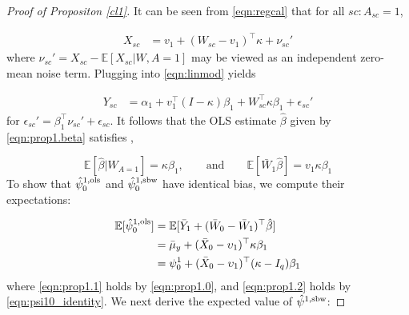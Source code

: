 \begin{proof}[Proof of Propositon \ref{cl1}]
It can be seen from \eqref{eqn:regcal} that for all $sc: A_{sc}=1$,

\begin{align*}
   X_{sc} &= v_1 + (W_{sc} - v_1)^\top \kappa + \nu_{sc}'
\end{align*}
where $\nu_{sc}' = X_{sc} - \mathbb{E}[X_{sc}|W,A=1]$ may be viewed as an independent zero-mean noise term. Plugging into \eqref{eqn:linmod} yields 

\begin{align*}
   Y_{sc} & = \alpha_1 + v_1^\top (I - \kappa)\beta_1 + W_{sc}^\top \kappa \beta_1 + \epsilon_{sc}'
\end{align*}
for $\epsilon_{sc}' = \beta_1^\top\nu_{sc}' + \epsilon_{sc}$. It follows that the OLS estimate $\hat{\beta}$ given by \eqref{eqn:prop1.beta} satisfies \citep{gleser1992importance},

\begin{equation}\label{eqn:prop1.0}
\mathbb{E}[\hat{\beta}|W_{A=1}] = \kappa \beta_1, \qquad \text{and} \qquad \mathbb{E}[\bar{W}_1 \hat{\beta}] = v_1 \kappa \beta_1
\end{equation}
To show that $\hat{\psi}_0^{1,\textup{ols}}$ and $\hat{\psi}_0^{1, \textup{sbw}}$ have identical bias, we compute their expectations:

\begin{align}
\nonumber	\mathbb{E}[\hat{\psi}_0^{1,\textup{ols}}] &= \mathbb{E}[ \bar{Y}_1 + (\bar{W}_0 - \bar{W}_1)^\top \hat{\beta}] \\
	& = \bar{\mu}_y + (\bar{X}_0 - \upsilon_1)^\top\kappa\beta_1 \label{eqn:prop1.1}\\
	& = \psi_0^1 + (\bar{X}_0 - \upsilon_1)^\top(\kappa - I_q)\beta_1 \label{eqn:prop1.2}
\end{align}
where \eqref{eqn:prop1.1} holds by \eqref{eqn:prop1.0}, and \eqref{eqn:prop1.2} holds by \eqref{eqn:psi10_identity}. We next derive the expected value of $\hat{\psi}^{1, \textup{sbw}}$:


\end{proof}
